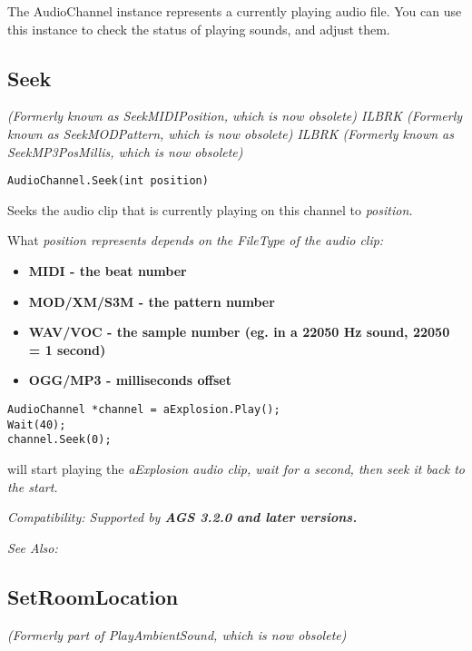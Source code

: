 The AudioChannel instance represents a currently playing audio file. You can use this
instance to check the status of playing sounds, and adjust them.


\subsection{Seek}\label{AudioChannel.Seek}%

\it{(Formerly known as SeekMIDIPosition, which is now obsolete)} ILBRK
\it{(Formerly known as SeekMODPattern, which is now obsolete)} ILBRK
\it{(Formerly known as SeekMP3PosMillis, which is now obsolete)}

\begin{verbatim}
AudioChannel.Seek(int position)
\end{verbatim}
Seeks the audio clip that is currently playing on this channel to \it{position}.

What \it{position} represents depends on the FileType of the audio clip:
\begin{itemize}
\item \bf{MIDI} - the beat number
\item \bf{MOD/XM/S3M} - the pattern number
\item \bf{WAV/VOC} - the sample number (eg. in a 22050 Hz sound, 22050 = 1 second)
\item \bf{OGG/MP3} - milliseconds offset
\end{itemize}

\begin{verbatim}
AudioChannel *channel = aExplosion.Play();
Wait(40);
channel.Seek(0);
\end{verbatim}
will start playing the \it{aExplosion} audio clip, wait for a second, then seek it back to the start.

\it{Compatibility:} Supported by \bf{AGS 3.2.0} and later versions.

\it{See Also:} 


\subsection{SetRoomLocation}\label{AudioChannel.SetRoomLocation}%

\it{(Formerly part of PlayAmbientSound, which is now obsolete)}

